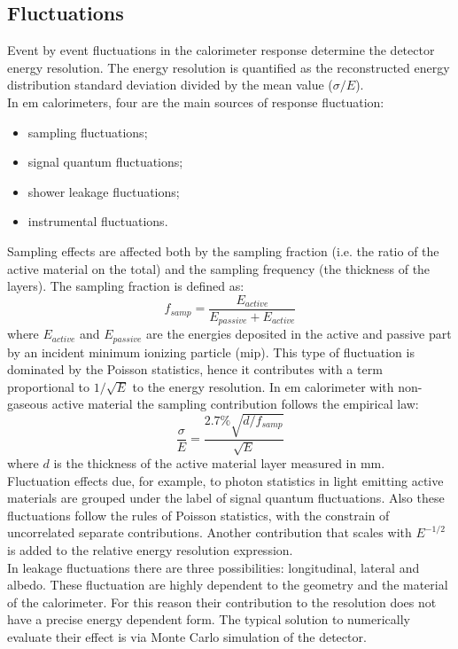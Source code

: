 \subsection{Fluctuations}
Event by event fluctuations in the calorimeter response determine the detector energy resolution. The energy resolution is quantified as the reconstructed energy distribution standard deviation divided by the mean value ($\sigma/E$).\\
In em calorimeters, four are the main sources of response fluctuation:
\begin{itemize}
    \item sampling fluctuations;
    \item signal quantum fluctuations;
    \item shower leakage fluctuations;
    \item instrumental fluctuations.
\end{itemize}
Sampling effects are affected both by the sampling fraction (i.e. the ratio of the active material on the total) and the sampling frequency (the thickness of the layers). The sampling fraction is  defined as:
\begin{equation}
    f_{samp} = \frac{E_{active}}{E_{passive}+E_{active}}
\end{equation}
where $E_{active}$ and $E_{passive}$ are the energies deposited in the active and passive part by an incident minimum ionizing particle (mip).
This type of fluctuation is dominated by the Poisson statistics, hence it contributes with a term proportional to $1/\sqrt{E}$ to the energy resolution.
In em calorimeter with non-gaseous active material the sampling contribution follows the empirical law:
\begin{equation}
    \frac{\sigma}{E} = \frac{2.7\% \sqrt{d/f_{samp}}}{\sqrt{E}}
\end{equation}
where $d$ is the thickness of the active material layer measured in mm.\\
Fluctuation effects due, for example, to photon statistics in light emitting active materials are grouped under the label of signal quantum fluctuations. Also these fluctuations follow the rules of Poisson statistics, with the constrain of uncorrelated separate contributions. Another contribution that scales with $E^{-1/2}$ is added to the relative energy resolution expression.\\
In leakage fluctuations there are three possibilities: longitudinal, lateral and albedo. These fluctuation are highly dependent to the geometry and the material of the calorimeter. For this reason their contribution to the resolution does not have a precise energy dependent form. The typical solution to numerically evaluate their effect is via Monte Carlo simulation of the detector.\\
